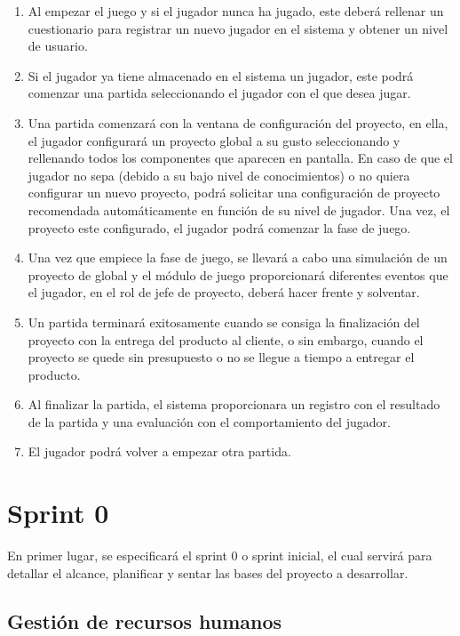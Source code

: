 \begin{enumerate}
	\item Al empezar el juego y si el jugador nunca ha jugado, este deberá rellenar un cuestionario para registrar un nuevo jugador en el sistema y obtener un nivel de usuario.
	\item Si el jugador ya tiene almacenado en el sistema un jugador, este podrá comenzar una partida seleccionando el jugador con el que desea jugar.
	\item Una partida comenzará con la ventana de configuración del proyecto, en ella, el jugador configurará un proyecto global a su gusto seleccionando y rellenando todos los componentes que aparecen en pantalla. En caso de que el jugador no sepa (debido a su bajo nivel de conocimientos) o no quiera configurar un nuevo proyecto, podrá solicitar una configuración de proyecto recomendada automáticamente en función de su nivel de jugador. Una vez, el proyecto este configurado, el jugador podrá comenzar la fase de juego.
	\item Una vez que empiece la fase de juego, se llevará a cabo una simulación de un proyecto de global y el módulo de juego proporcionará diferentes eventos que el jugador, en el rol de jefe de proyecto, deberá hacer frente y solventar.
	\item Un partida terminará exitosamente cuando se consiga la finalización del proyecto con la entrega del producto al cliente, o sin embargo, cuando el proyecto se quede sin presupuesto o no se llegue a tiempo a entregar el producto.
	\item Al finalizar la partida, el sistema proporcionara un registro con el resultado de la partida y una evaluación con el comportamiento del jugador.
	\item El jugador podrá volver a empezar otra partida.
\end{enumerate}

\section{Sprint 0}
\label{sec:Sprint0}

En primer lugar, se especificará el sprint 0 o sprint inicial, el cual servirá para detallar el alcance, planificar y sentar las bases del proyecto a desarrollar.

\subsection{Gestión de recursos humanos}
\label{sec:GestionRecursosHumanos}

